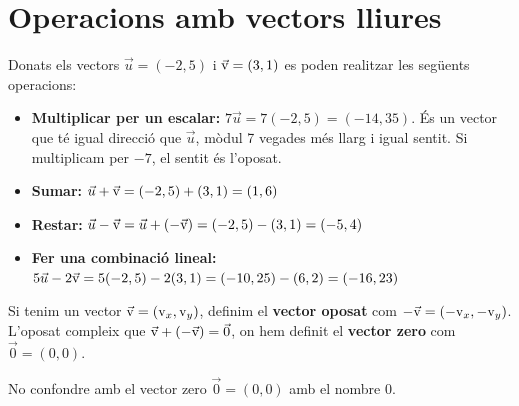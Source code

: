 \section{Operacions amb vectors lliures}

\begin{theorybox}
	Donats els vectors $\vec u=(-2, 5)$ i $\vec{\mathrm{v}}=(3,1)$ es poden realitzar les següents operacions:
	
	\begin{itemize}
		\item \textbf{Multiplicar per un escalar:}  $7 \vec u = 7 (-2, 5) = (-14, 35)$. És un vector que té igual direcció que $\vec u$, mòdul 7 vegades més llarg i igual sentit. Si multiplicam per $-7$, el sentit és l'oposat.
		
		\item \textbf{Sumar:} $\vec u + \vec{\mathrm{v}}=(-2, 5)  + (3,1) = (1, 6)$
		
		\item \textbf{Restar:} $\vec u - \vec{\mathrm{v}}=\vec u + (-\vec{\mathrm{v}})=(-2, 5)  - (3,1) = (-5, 4)$
		
		\item \textbf{Fer una combinació lineal:} $5 \vec u - 2\vec{\mathrm{v}} =5(-2, 5)  - 2(3,1) = (-10, 25)-(6,2)=(-16, 23)$
	\end{itemize}

	Si tenim un vector $\vec{\mathrm{v}}=(\mathrm{v}_x,\mathrm{v}_y)$, definim el \textbf{vector oposat} com $-\vec{\mathrm{v}}=(-\mathrm{v}_x, -\mathrm{v}_y)$. L'oposat compleix que $\vec{\mathrm{v}}+(-\vec{\mathrm{v}})=\vec 0$,
on hem definit el \textbf{vector zero} com $\vec 0=(0, 0)$.

\end{theorybox}
\begin{warningbox}
 No confondre amb el vector zero  $\vec 0=(0, 0)$ amb el nombre $0$.
	
\end{warningbox}


